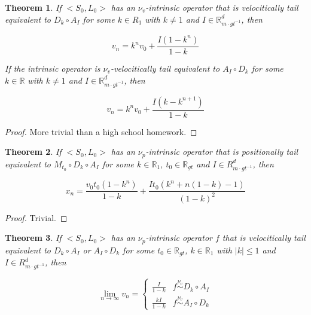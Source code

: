 \documentclass{book}
\newtheorem{theorem}{Theorem}
\theoremstyle{definition}\newtheorem{mechanism}{Mechanism}
\theoremstyle{remark}\newtheorem*{remark}{Remark}
\begin{document}
\begin{theorem}\label{thm:vel-formula}
	If $<S_0, L_0>$ has an $\nu_v$-intrinsic operator that is velocitically tail equivalent to $D_k \circ A_I$ for some $k\in R_1$ with $k \ne 1$ and $I \in \mathbb R_{m\cdot gt^{-1}}^d$, then
	
	\begin{equation}
		v_n = k^{n} v_0 + \frac{I(1 - k^{n})}{1 - k}
	\end{equation}
	
	If the intrinsic operator is $\nu_v$-velocitically tail equivalent to $A_I \circ D_k$ for some $k\in \mathbb R$ with $k \ne 1$ and $I \in \mathbb R_{m\cdot gt^{-1}}^d$, then
	
	\begin{equation}
		v_n = k^{n} v_0 + \frac{I(k - k^{n + 1})}{1 - k}
	\end{equation}
\end{theorem}

\begin{proof}
	More trivial than a high school homework.
\end{proof}

\begin{theorem}\label{thm:disp-formula}
	If $<S_0, L_0>$ has an $\nu_p$-intrinsic operator that is positionally tail equivalent to $M_{t_0} \circ D_k \circ A_I$ for some $k\in \mathbb R_1$, $t_0 \in \mathbb R_{gt}$ and $I\in R_{m\cdot gt^{-1}}^d$, then
	
	\begin{equation}
		x_n = \frac{v_0t_0(1 - k^n)}{1 - k} + \frac{It_0(k^n + n(1 - k) - 1)}{(1 - k)^2}
	\end{equation}
\end{theorem}

\begin{proof}
	Trivial.
\end{proof}

\begin{theorem}\label{thm:vel-convergence}
	If $<S_0, L_0>$ has an $\nu_p$-intrinsic operator $f$ that is velocitically tail equivalent to $D_k \circ A_I$ or $A_I \circ D_k$ for some $t_0 \in \mathbb R_{gt}$, $k\in \mathbb R_1$ with $|k| \le 1$ and $I\in R_{m\cdot gt^{-1}}^d$, then
	
	\begin{equation}
		\lim_{n \to \infty} v_n = \begin{cases}
			\frac{I}{1 - k} & f \overset{\nu_v}{\sim} D_k \circ A_I\\
			\frac{kI}{1 - k} & f \overset{\nu_v}{\sim} A_I \circ D_k
		\end{cases}
	\end{equation}
\end{theorem}
\end{document}
